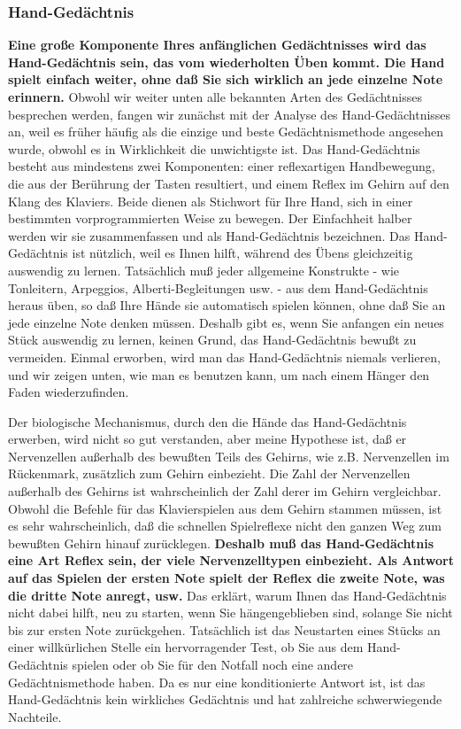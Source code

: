 \subsubsection{Hand-Gedächtnis}
\label{c1iii6d}

\textbf{Eine große Komponente Ihres anfänglichen Gedächtnisses wird das Hand-Gedächtnis sein, das vom wiederholten Üben kommt.
Die Hand spielt einfach weiter, ohne daß Sie sich wirklich an jede einzelne Note  erinnern.}
Obwohl wir weiter unten alle bekannten Arten des Gedächtnisses besprechen werden, fangen wir zunächst mit der Analyse des Hand-Gedächtnisses an, weil es früher häufig als die einzige und beste Gedächtnismethode angesehen wurde, obwohl es in Wirklichkeit die unwichtigste ist.
Das Hand-Gedächtnis besteht aus mindestens zwei Komponenten: einer reflexartigen Handbewegung, die aus der Berührung der Tasten resultiert, und einem Reflex im Gehirn auf den Klang des Klaviers.
Beide dienen als Stichwort für Ihre Hand, sich in einer bestimmten vorprogrammierten Weise zu bewegen.
Der Einfachheit halber werden wir sie zusammenfassen und als Hand-Gedächtnis bezeichnen.
Das Hand-Gedächtnis ist nützlich, weil es Ihnen hilft, während des Übens gleichzeitig auswendig zu lernen.
Tatsächlich muß jeder allgemeine Konstrukte - wie Tonleitern, Arpeggios, Alberti-Begleitungen usw. - aus dem Hand-Gedächtnis heraus üben, so daß Ihre Hände sie automatisch spielen können, ohne daß Sie an jede einzelne Note denken müssen.
Deshalb gibt es, wenn Sie anfangen ein neues Stück auswendig zu lernen, keinen Grund, das Hand-Gedächtnis bewußt zu vermeiden.
Einmal erworben, wird man das Hand-Gedächtnis niemals verlieren, und wir zeigen unten, wie man es benutzen kann, um nach einem Hänger den Faden wiederzufinden.

Der biologische Mechanismus, durch den die Hände das Hand-Gedächtnis erwerben, wird nicht so gut verstanden, aber meine Hypothese ist, daß er Nervenzellen außerhalb des bewußten Teils des Gehirns, wie z.B. Nervenzellen im Rückenmark, zusätzlich zum Gehirn einbezieht.
Die Zahl der Nervenzellen außerhalb des Gehirns ist wahrscheinlich der Zahl derer im Gehirn vergleichbar.
Obwohl die Befehle für das Klavierspielen aus dem Gehirn stammen müssen, ist es sehr wahrscheinlich, daß die schnellen Spielreflexe nicht den ganzen Weg zum bewußten Gehirn hinauf zurücklegen.
\textbf{Deshalb muß das Hand-Gedächtnis eine Art Reflex sein, der viele Nervenzelltypen einbezieht.
Als Antwort auf das Spielen der ersten Note spielt der Reflex die zweite Note, was die dritte Note anregt, usw.}
Das erklärt, warum Ihnen das Hand-Gedächtnis nicht dabei hilft, neu zu starten, wenn Sie hängengeblieben sind, solange Sie nicht bis zur ersten Note zurückgehen.
Tatsächlich ist das Neustarten eines Stücks an einer willkürlichen Stelle ein hervorragender Test, ob Sie aus dem Hand-Gedächtnis spielen oder ob Sie für den Notfall noch eine andere Gedächtnismethode haben.
Da es nur eine konditionierte Antwort ist, ist das Hand-Gedächtnis kein wirkliches Gedächtnis und hat zahlreiche schwerwiegende Nachteile.

